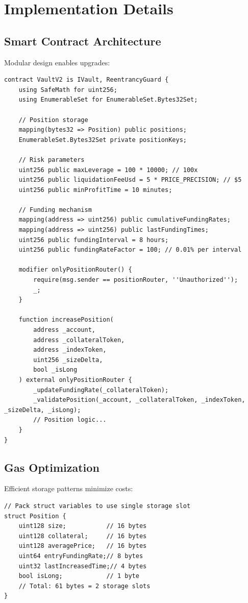 \section{Implementation Details}


\subsection{Smart Contract Architecture}

Modular design enables upgrades:

\begin{lstlisting}[caption={Core Contract Structure}]
contract VaultV2 is IVault, ReentrancyGuard {
    using SafeMath for uint256;
    using EnumerableSet for EnumerableSet.Bytes32Set;

    // Position storage
    mapping(bytes32 => Position) public positions;
    EnumerableSet.Bytes32Set private positionKeys;

    // Risk parameters
    uint256 public maxLeverage = 100 * 10000; // 100x
    uint256 public liquidationFeeUsd = 5 * PRICE_PRECISION; // $5
    uint256 public minProfitTime = 10 minutes;

    // Funding mechanism
    mapping(address => uint256) public cumulativeFundingRates;
    mapping(address => uint256) public lastFundingTimes;
    uint256 public fundingInterval = 8 hours;
    uint256 public fundingRateFactor = 100; // 0.01% per interval

    modifier onlyPositionRouter() {
        require(msg.sender == positionRouter, ''Unauthorized'');
        _;
    }

    function increasePosition(
        address _account,
        address _collateralToken,
        address _indexToken,
        uint256 _sizeDelta,
        bool _isLong
    ) external onlyPositionRouter {
        _updateFundingRate(_collateralToken);
        _validatePosition(_account, _collateralToken, _indexToken, _sizeDelta, _isLong);
        // Position logic...
    }
}
\end{lstlisting}

\subsection{Gas Optimization}

Efficient storage patterns minimize costs:

\begin{lstlisting}[caption={Storage Optimization}]
// Pack struct variables to use single storage slot
struct Position {
    uint128 size;           // 16 bytes
    uint128 collateral;     // 16 bytes
    uint128 averagePrice;   // 16 bytes
    uint64 entryFundingRate;// 8 bytes
    uint32 lastIncreasedTime;// 4 bytes
    bool isLong;            // 1 byte
    // Total: 61 bytes = 2 storage slots
}
\end{lstlisting}

